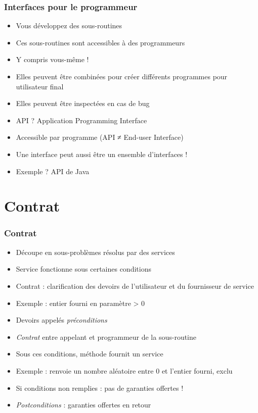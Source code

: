 \documentclass[english, french]{beamer}
\begin{document}
\begin{frame}
	\frametitle{Interfaces pour le programmeur}
	\begin{itemize}
		\item Vous développez des sous-routines
		\item Ces sous-routines sont accessibles à des programmeurs
		\item Y compris vous-même !
		\item Elles peuvent être combinées pour créer différents programmes pour utilisateur final
		\item Elles peuvent être inspectées en cas de bug
		\item API ? \pause Application Programming Interface
		\item Accessible par programme (API ≠ End-user Interface)
		\item Une interface peut aussi être un ensemble d’interfaces !
		\item Exemple ? \pause API de Java
	\end{itemize}
\end{frame}

\section{Contrat}
\begin{frame}
	\frametitle{Contrat}
	\begin{itemize}
		\item Découpe en sous-problèmes résolus par des services
		\item Service fonctionne sous certaines conditions
		\item Contrat : clarification des devoirs de l’utilisateur et du fournisseur de service
		\item Exemple : entier fourni en paramètre > 0
		\item Devoirs appelés \emph{préconditions}
		\item \emph{Contrat} entre appelant et programmeur de la sous-routine
		\item Sous ces conditions, méthode fournit un service
		\item Exemple : renvoie un nombre aléatoire entre 0 et l’entier fourni, exclu
		\item Si conditions non remplies : pas de garanties offertes !
		\item \emph{Postconditions} : garanties offertes en retour
	\end{itemize}
\end{frame}
\end{document}
